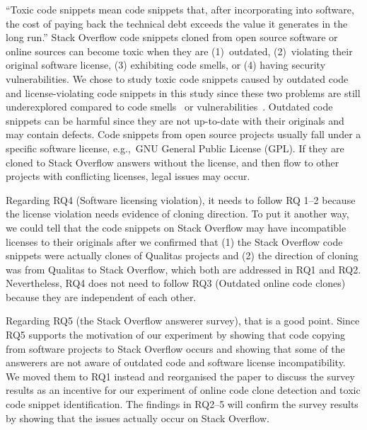 \documentclass[a4paper,twoside,10pt]{reviewresponse}
\begin{document}
``Toxic code snippets mean code snippets that, after incorporating into
software, the cost of paying back the technical debt exceeds the value it
generates in the long run.'' Stack Overflow code snippets cloned from open
source software or online sources can become toxic when they are (1)~outdated,
(2)~violating their original software license, (3) exhibiting code smells, or
(4) having security vulnerabilities. We chose to study toxic code snippets
caused by outdated code and license-violating code snippets in this study since
these two problems are still underexplored compared to code
smells~\citep{Tufano2015} or vulnerabilities~\citep{Acar2016,Fischer2017}.
Outdated code snippets can be harmful since they are not up-to-date with their
originals and may contain defects. Code snippets from open source projects
usually fall under a specific software license, e.g.,\ GNU General Public License
(GPL). If they are cloned to Stack Overflow answers without the license, and
then flow to other projects with conflicting licenses, legal issues may occur.


Regarding RQ4 (Software licensing violation), it needs to follow RQ 1--2 because
the license violation needs evidence of cloning direction. To put it another
way, we could tell that the code snippets on Stack Overflow may have
incompatible licenses to their originals after we confirmed that (1) the Stack
Overflow code snippets were actually clones of Qualitas projects and (2) the
direction of cloning was from Qualitas to Stack Overflow, which both are
addressed in RQ1 and RQ2. Nevertheless, RQ4 does not need to follow RQ3
(Outdated online code clones) because they are independent of each other.

Regarding RQ5 (the Stack Overflow answerer survey), that is a good point. Since
RQ5 supports the motivation of our experiment by showing that code
copying from software projects to Stack Overflow occurs and showing
that some of the answerers are not aware of outdated code and software license
incompatibility. We moved them to RQ1 instead and reorganised the paper to
discuss the survey results as an incentive for our experiment of online code
clone detection and toxic code snippet identification. The findings in RQ2--5
will confirm the survey results by showing that the issues actually occur on
Stack Overflow.
\end{document}
